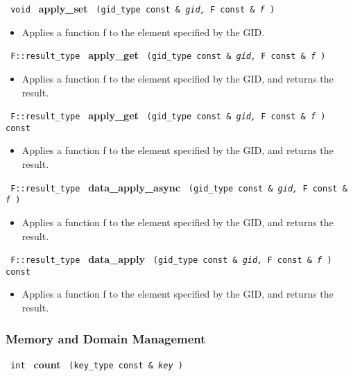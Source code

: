 \noindent
\texttt{%
void
}
\textbf{apply\_set}%
\texttt{%
(gid\_type const \&
\textit{gid,}%
F const \&
\textit{f}%
)
}

\begin{itemize}
\item
Applies a function f to the element specified by the GID.
\end{itemize}
 
\noindent
\texttt{%
F::result\_type
}
\textbf{apply\_get}%
\texttt{%
(gid\_type const \&
\textit{gid,}%
F const \&
\textit{f}%
)
}

\begin{itemize}
\item
Applies a function f to the element specified by the GID, and returns the result.
\end{itemize}
 
\noindent
\texttt{%
F::result\_type
}
\textbf{apply\_get}%
\texttt{%
(gid\_type const \&
\textit{gid,}%
F const \&
\textit{f}%
) const
}

\begin{itemize}
\item
Applies a function f to the element specified by the GID, and returns the result.
\end{itemize}
 
\noindent
\texttt{%
F::result\_type
}
\textbf{data\_apply\_async}%
\texttt{%
(gid\_type const \&
\textit{gid,}%
F const \&
\textit{f}%
)
}

\begin{itemize}
\item
Applies a function f to the element specified by the GID, and returns the result.
\end{itemize}
 
\noindent
\texttt{%
F::result\_type
}
\textbf{data\_apply}%
\texttt{%
(gid\_type const \&
\textit{gid,}%
F const \&
\textit{f}%
) const
}

\begin{itemize}
\item
Applies a function f to the element specified by the GID, and returns the result.
\end{itemize}
 
\subsubsection{Memory and Domain Management}

\noindent
\texttt{%
int
}
\textbf{count}%
\texttt{%
(key\_type const \&
\textit{key}%
)
}

